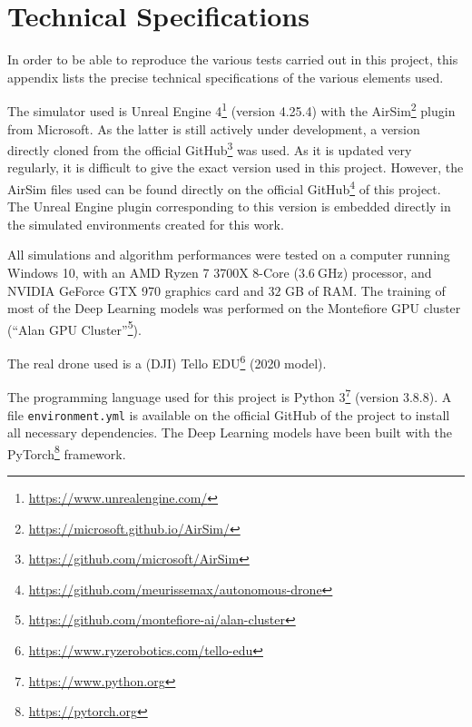 \chapter{Technical Specifications}\label{ch:technical.specifications}

In order to be able to reproduce the various tests carried out in this project, this appendix lists the precise technical specifications of the various elements used.

The simulator used is Unreal Engine 4\footnote{\url{https://www.unrealengine.com/}} (version 4.25.4) with the AirSim\footnote{\url{https://microsoft.github.io/AirSim/}} plugin from Microsoft. As the latter is still actively under development, a version directly cloned from the official GitHub\footnote{\url{https://github.com/microsoft/AirSim}} was used. As it is updated very regularly, it is difficult to give the exact version used in this project. However, the AirSim files used can be found directly on the official GitHub\footnote{\url{https://github.com/meurissemax/autonomous-drone}} of this project. The Unreal Engine plugin corresponding to this version is embedded directly in the simulated environments created for this work.

All simulations and algorithm performances were tested on a computer running Windows 10, with an AMD Ryzen 7 3700X 8-Core ($\SI{3.6}{\giga\hertz}$) processor, and NVIDIA GeForce GTX 970 graphics card and $\num{32}$ GB of RAM. The training of most of the Deep Learning models was performed on the Montefiore GPU cluster (\enquote{Alan GPU Cluster}\footnote{\url{https://github.com/montefiore-ai/alan-cluster}}).

The real drone used is a (DJI) Tello EDU\footnote{\url{https://www.ryzerobotics.com/tello-edu}} (2020 model).

The programming language used for this project is Python 3\footnote{\url{https://www.python.org}} (version 3.8.8). A file \texttt{environment.yml} is available on the official GitHub of the project to install all necessary dependencies. The Deep Learning models have been built with the PyTorch\footnote{\url{https://pytorch.org}} framework.
